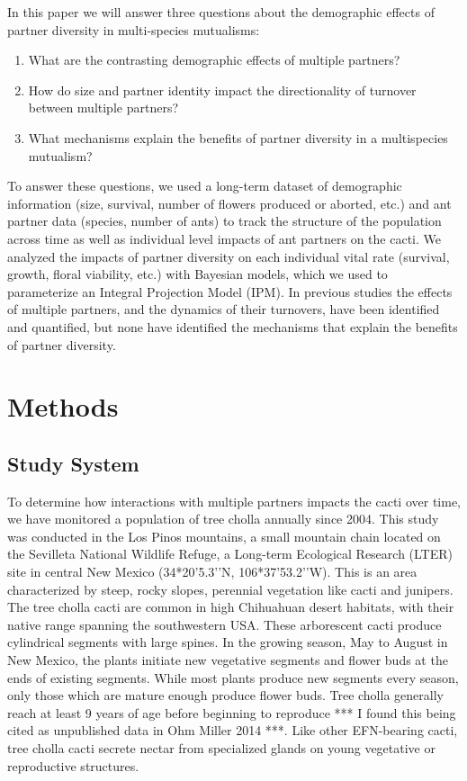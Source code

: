 \documentclass[12pt,a4paper]{article}
\begin{document}
In this paper we will answer three questions about the demographic effects of partner diversity in multi-species mutualisms:
\begin{enumerate}
	\item{What are the contrasting demographic effects of multiple partners?}
	\item{How do size and partner identity impact the directionality of turnover between multiple partners?}
	\item{What mechanisms explain the benefits of partner diversity in a multispecies mutualism?}
\end{enumerate}


To answer these questions, we used a long-term dataset of demographic information (size, survival, number of flowers produced or aborted, etc.) and ant partner data (species, number of ants) to track the structure of the population across time as well as individual level impacts of ant partners on the cacti. 
We analyzed the impacts of partner diversity on each individual vital rate (survival, growth, floral viability, etc.) with Bayesian models, which we used to parameterize an Integral Projection Model (IPM).
In previous studies the effects of multiple partners, and the dynamics of their turnovers, have been identified and quantified\cite{Palmer2010, Nishi2013, Hussa2013}, but none have identified the mechanisms that explain the benefits of partner diversity. 


\section*{Methods}
\subsection*{Study System}

To determine how interactions with multiple partners impacts the cacti over time, we have monitored a population of tree cholla annually since 2004. 
This study was conducted in the Los Pinos mountains, a small mountain chain located on the Sevilleta National Wildlife Refuge, a Long-term Ecological Research (LTER) site in central New Mexico (34*20’5.3’’N, 106*37’53.2’’W).
This is an area characterized by steep, rocky slopes, perennial vegetation like cacti and junipers. 
The tree cholla cacti are common in high Chihuahuan desert habitats, with their native range spanning the southwestern USA\cite{Benson1982}. 
These arborescent cacti produce cylindrical segments with large spines. 
In the growing season, May to August in New Mexico, the plants initiate new vegetative segments and flower buds at the ends of existing segments. 
While most plants produce new segments every season, only those which are mature enough produce flower buds. 
Tree cholla generally reach at least 9 years of age before beginning to reproduce *** I found this being cited as unpublished data in Ohm Miller 2014 ***. 
Like other EFN-bearing cacti, tree cholla cacti secrete nectar from specialized glands on young vegetative or reproductive structures\cite{Ness2006,Oliveira1999}.
\end{document}
